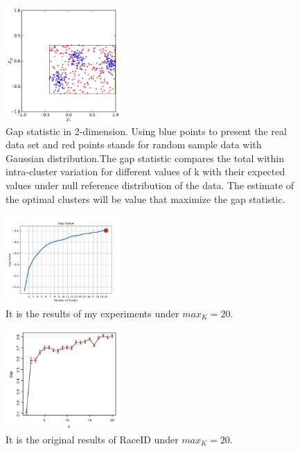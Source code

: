 \documentclass[10pt,journal]{IEEEtran}
\begin{document}
 \begin{figure}[H] 
\centering
\includegraphics[width=0.4\textwidth]{fig2/gap1.png} 
\caption{Gap statistic in 2-dimension. Using blue points to present the real data set and red points stands for random sample data with Gaussian distribution.The gap statistic compares the total within intra-cluster variation for different values of k with their expected values under null reference distribution of the data. The estimate of the optimal clusters will be value that maximize the gap statistic. } 
\label{Fig.2}
\end{figure}

 \begin{figure}[H] 
\centering
\includegraphics[width=0.4\textwidth]{fig2/gap2.png} 
\caption{It is the results of my experiments under \(max_K=20.\)} 
\label{Fig.4}
\end{figure}

 \begin{figure}[H] 
\centering
\includegraphics[width=0.4\textwidth]{fig2/gap3.png} 
\caption{ It is the original  results of RaceID under \(max_K=20\).} 
\label{Fig.5}
\end{figure}
\end{document}
